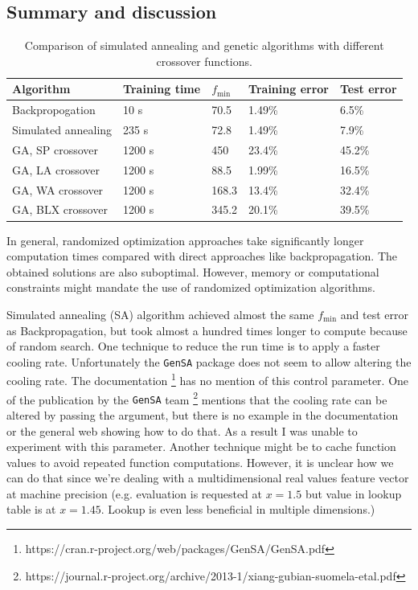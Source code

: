 \documentclass[10pt,letterpaper]{article}
\begin{document}
\subsection{Summary and discussion}
\begin{table}[htbp]
	\caption{ Comparison of simulated annealing and genetic algorithms with different crossover functions. \label{tab1}}
	\centering
    \begin{tabular}{p{3cm}|p{1.5cm}|p{1cm}|p{2.2cm}|p{}}
         \hline
            	{\bf Algorithm} & {\bf Training time} & {$f_{\text{min}}$} & {\bf Training error} & {\bf Test error}\\ \hline \hline
	         Backpropogation & 10 s & 70.5 & 1.49\% & 6.5\% \\ \hline
		Simulated annealing & 235 s & 72.8 & 1.49\% & 7.9\%\\ \hline
		GA, SP crossover & 1200 s & 450& 23.4\% & 45.2\%\\ \hline
		GA, LA crossover & 1200 s & 88.5 & 1.99\% & 16.5\%\\ \hline
		GA, WA crossover & 1200 s & 168.3 & 13.4\% & 32.4\%\\ \hline
		GA, BLX crossover & 1200 s & 345.2 & 20.1\% & 39.5\%\\ \hline
    \end{tabular}
\end{table}
In general, randomized optimization approaches take significantly longer computation times compared with direct approaches like backpropagation. The obtained solutions are also suboptimal. However, memory or computational constraints might mandate the use of randomized optimization algorithms.

Simulated annealing (SA) algorithm achieved almost the same $f_{\text{min}}$ and test error as Backpropagation, but took almost a hundred times longer to compute because of random search. One technique to reduce the run time is to apply a faster cooling rate. Unfortunately the {\tt GenSA} package does not seem to allow altering the cooling rate. The documentation \footnote{https://cran.r-project.org/web/packages/GenSA/GenSA.pdf} has no mention of this control parameter. One of the publication by the {\tt GenSA} team \footnote{https://journal.r-project.org/archive/2013-1/xiang-gubian-suomela-etal.pdf} mentions that the cooling rate can be altered by passing the argument, but there is no example in the documentation or the general web showing how to do that. As a result I was unable to experiment with this parameter. Another technique might be to cache function values to avoid repeated function computations. However, it is unclear how we can do that since we're dealing with a multidimensional real values feature vector at machine precision (e.g. evaluation is requested at $x = 1.5$ but value in lookup table is at $x = 1.45$. Lookup is even less beneficial in multiple dimensions.) 
\end{document}
